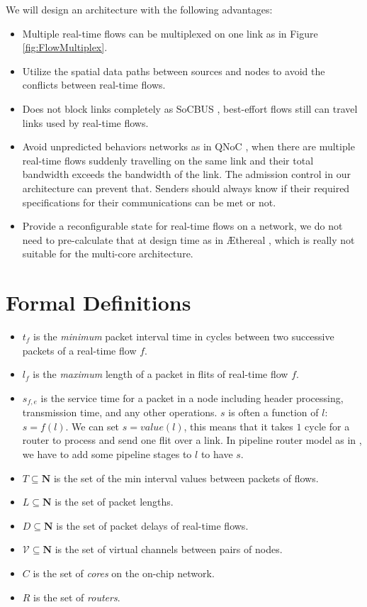 \documentclass[a4]{article}
\begin{document}
We will design an architecture with the following advantages:
\begin{itemize}
\item Multiple real-time flows can be multiplexed on one link
\cite{Ferrari90ascheme} as in Figure \ref{fig:FlowMultiplex}.
\item Utilize the spatial data paths between sources and nodes to avoid the 
conflicts between real-time flows.
\item Does not block links completely as SoCBUS \cite{SoCBUS}, best-effort flows 
still can travel links used by real-time flows.
\item Avoid unpredicted behaviors networks as in QNoC \cite{QNoC}, when there are 
multiple real-time flows suddenly travelling on the same link and their total bandwidth 
exceeds the bandwidth of the link. The admission control in our architecture can 
prevent that. Senders should always know if their required specifications for 
their communications can be met or not. 
\item Provide a reconfigurable state for real-time flows on a network, we do not 
need to pre-calculate that at design time as in \AE thereal \cite{Goossens_chapter4}, 
which is really not suitable for the multi-core architecture.
\end{itemize}
\section{Formal Definitions}
\begin{itemize}
\item $t_f$ is the {\em minimum} packet interval time in cycles between two
successive packets of a real-time flow $f$.
\item $l_f$ is the {\em maximum} length of a packet in flits of real-time flow
$f$.
\item $s_{f,e}$ is the service time for a packet in a node including header 
processing, transmission time, and any other operations. $s$ is often a 
function of $l$: $s=f(l)$. We can set $s=value(l)$, this means that it takes $1$
cycle for a router to process and send one flit over a link. In pipeline router
model as in \cite{PehDelayModel, PehSpecPipeR}, we have to add some pipeline
stages to $l$ to have $s$.
\item $T \subseteq \mathbf{N}$ is the set of the min interval values between packets of flows. 
\item $L \subseteq \mathbf{N}$ is the set of packet lengths.
\item $D \subseteq \mathbf{N}$ is the set of packet delays of real-time flows.
\item $\mathcal{V} \subseteq \mathbf{N}$ is the set of virtual channels between pairs of nodes.
\item $C$ is the set of {\em cores} on the on-chip network.
\item $R$ is the set of {\em routers}.
\end{itemize}
\end{document}

